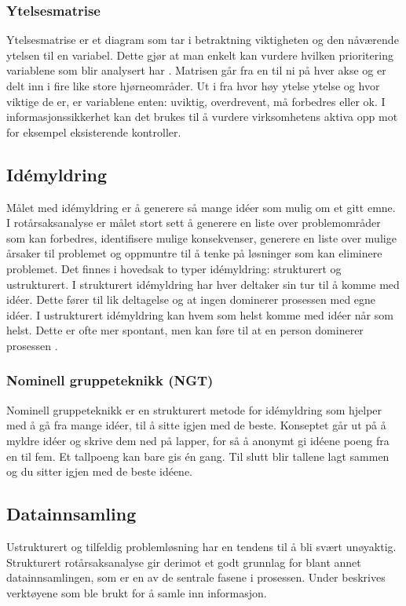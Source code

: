 \subsubsection{Ytelsesmatrise}
Ytelsesmatrise er et diagram som tar i betraktning viktigheten og den nåværende ytelsen til en variabel. Dette gjør at man enkelt kan vurdere hvilken prioritering variablene som blir analysert har \cite{RCA}. Matrisen går fra en til ni på hver akse og er delt inn i fire like store hjørneområder. Ut i fra hvor høy ytelse ytelse og hvor viktige de er, er variablene enten: uviktig, overdrevent, må forbedres eller ok. I informasjonssikkerhet kan det brukes til å vurdere virksomhetens aktiva opp mot for eksempel eksisterende kontroller.

\subsection{Idémyldring}
Målet med idémyldring er å generere så mange idéer som mulig om et gitt emne. I rotårsaksanalyse er målet stort sett å generere en liste over problemområder som kan forbedres, identifisere mulige konsekvenser, generere en liste over mulige årsaker til problemet og oppmuntre til å tenke på løsninger som kan eliminere problemet. Det finnes i hovedsak to typer idémyldring: strukturert og ustrukturert. I strukturert idémyldring har hver deltaker sin tur til å komme med idéer. Dette fører til lik deltagelse og at ingen dominerer prosessen med egne idéer. I ustrukturert idémyldring kan hvem som helst komme med idéer når som helst. Dette er ofte mer spontant, men kan føre til at en person dominerer prosessen \cite{RCA}. 

\subsubsection{Nominell gruppeteknikk (NGT)}
Nominell gruppeteknikk er en strukturert metode for idémyldring som hjelper med å gå fra mange idéer, til å sitte igjen med de beste. Konseptet går ut på å myldre idéer og skrive dem ned på lapper, for så å anonymt gi idéene poeng fra en til fem. Et tallpoeng kan bare gis én gang. Til slutt blir tallene lagt sammen og du sitter igjen med de beste idéene. 

\subsection{Datainnsamling}
Ustrukturert og tilfeldig problemløsning har en tendens til å bli svært unøyaktig. Strukturert rotårsaksanalyse gir derimot et godt grunnlag for blant annet datainnsamlingen, som er en av de sentrale fasene i prosessen. Under beskrives verktøyene som ble brukt for å samle inn informasjon. 


